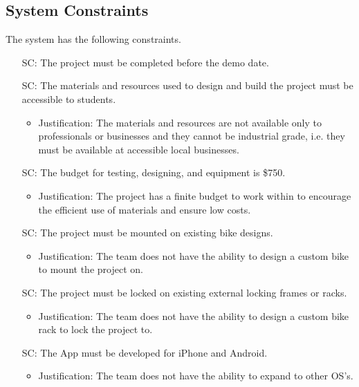 \documentclass[12pt]{article}
\newcounter{scnum} %
\begin{document}
\subsection{System Constraints}

The system has the following constraints.

\begin{itemize}

\item[SC\refstepcounter{scnum}\thescnum\label{SC1}:] The project must be completed before the demo date.

\item[SC\refstepcounter{scnum}\thescnum\label{SC2}:] The materials and resources used to design and build the project must be accessible to students.
	\begin{itemize}
		\item Justification: The materials and resources are not available only to professionals or businesses and they cannot be industrial grade, i.e. they must be available at accessible local businesses.
	\end{itemize} 

\item[SC\refstepcounter{scnum}\thescnum\label{SC3}:] The budget for testing, designing, and equipment is \$750.
	\begin{itemize}
		\item Justification: The project has a finite budget to work within to encourage the efficient use of materials and ensure low costs.
	\end{itemize} 
	
\item[SC\refstepcounter{scnum}\thescnum\label{SC4}:]  The project must be mounted on existing bike designs.
	\begin{itemize}
		\item Justification: The team does not have the ability to design a custom bike to mount the project on. 
	\end{itemize} 	
	
\item[SC\refstepcounter{scnum}\thescnum\label{SC5}:] The project must be locked on existing external locking frames or racks.
	\begin{itemize}
		\item Justification: The team does not have the ability to design a custom bike rack to lock the project to. 
	\end{itemize} 
	
\item[SC\refstepcounter{scnum}\thescnum\label{SC6}:] The App must be developed for iPhone and Android.
	\begin{itemize}
		\item Justification: The team does not have the ability to expand to other OS's.
	\end{itemize} 


\end{itemize}
\end{document}
